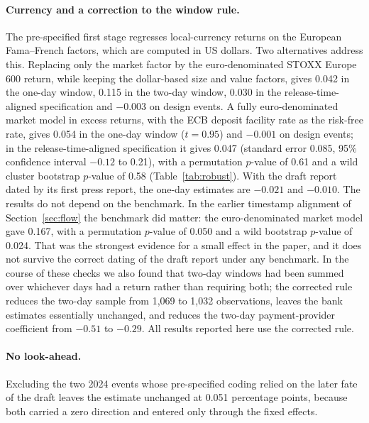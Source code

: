 \documentclass[11pt]{article}
\theoremstyle{plain}\newtheorem{proposition}{Proposition}
\begin{document}
\paragraph{Currency and a correction to the window rule.} The pre-specified first stage regresses local-currency returns on the European Fama--French factors, which are computed in US dollars. Two alternatives address this. Replacing only the market factor by the euro-denominated STOXX Europe 600 return, while keeping the dollar-based size and value factors, gives 0.042 in the one-day window, 0.115 in the two-day window, 0.030 in the release-time-aligned specification and $-0.003$ on design events. A fully euro-denominated market model in excess returns, with the ECB deposit facility rate as the risk-free rate, gives 0.054 in the one-day window ($t = 0.95$) and $-0.001$ on design events; in the release-time-aligned specification it gives 0.047 (standard error 0.085, 95\% confidence interval $-0.12$ to 0.21), with a permutation $p$-value of 0.61 and a wild cluster bootstrap $p$-value of 0.58 (Table~\ref{tab:robust}). With the draft report dated by its first press report, the one-day estimates are $-0.021$ and $-0.010$. The results do not depend on the benchmark. In the earlier timestamp alignment of Section~\ref{sec:flow} the benchmark did matter: the euro-denominated market model gave 0.167, with a permutation $p$-value of 0.050 and a wild bootstrap $p$-value of 0.024. That was the strongest evidence for a small effect in the paper, and it does not survive the correct dating of the draft report under any benchmark. In the course of these checks we also found that two-day windows had been summed over whichever days had a return rather than requiring both; the corrected rule reduces the two-day sample from 1,069 to 1,032 observations, leaves the bank estimates essentially unchanged, and reduces the two-day payment-provider coefficient from $-0.51$ to $-0.29$. All results reported here use the corrected rule.

\paragraph{No look-ahead.} Excluding the two 2024 events whose pre-specified coding relied on the later fate of the draft leaves the estimate unchanged at 0.051 percentage points, because both carried a zero direction and entered only through the fixed effects.
\end{document}
